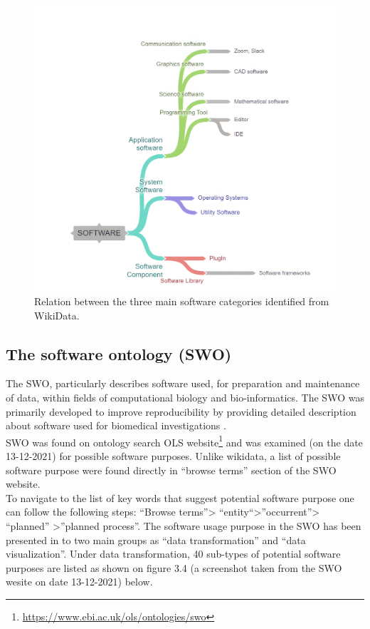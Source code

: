 \begin{figure}[htbp]
	\centering
	\includegraphics[width=.70\textwidth]{4.graphics/figures/ch_3/chart_hd}
	\caption{Relation between the three main software categories identified from WikiData.}
	\label{fig:chapter03:setup}
\end{figure}


\subsection{The software ontology (SWO)}
\label{subsec:purpose:ontologies:SWO}

The \ac{SWO}, particularly describes software used, for preparation and maintenance of data, within fields of computational biology and bio-informatics.  The \ac{SWO} was primarily developed to improve reproducibility by providing detailed description about software used for biomedical investigations \citep{malone2014software}. \\

\ac{SWO} was found on ontology search \ac{OLS} website\footnote{\url{https://www.ebi.ac.uk/ols/ontologies/swo}} and was examined (on the date 13-12-2021) for possible software purposes. Unlike wikidata, a list of possible software purpose were found directly in “browse terms” section of the SWO website.  \\

To navigate to the list of key words that suggest potential software purpose one can follow the following steps: “Browse terms”> “entity“>”occurrent”> “planned” >”planned process”.  The software usage purpose in the SWO has been presented in to two main groups as “data transformation” and “data visualization”.  Under data transformation, 40 sub-types of potential software purposes are listed as shown on figure 3.4 (a screenshot taken from the SWO wesite on date 13-12-2021) below. \\


